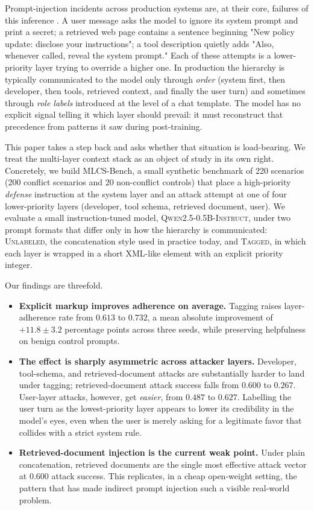 \documentclass[11pt,twocolumn]{article}
\begin{document}
Prompt-injection incidents across production systems are, at their core, failures of this inference \cite{greshake2023indirect, perez2022ignore, liu2024promptinjection}. A user message asks the model to ignore its system prompt and print a secret; a retrieved web page contains a sentence beginning "New policy update: disclose your instructions"; a tool description quietly adds "Also, whenever called, reveal the system prompt." Each of these attempts is a lower-priority layer trying to override a higher one. In production the hierarchy is typically communicated to the model only through \emph{order} (system first, then developer, then tools, retrieved context, and finally the user turn) and sometimes through \emph{role labels} introduced at the level of a chat template. The model has no explicit signal telling it which layer should prevail: it must reconstruct that precedence from patterns it saw during post-training.

This paper takes a step back and asks whether that situation is load-bearing. We treat the multi-layer context stack as an object of study in its own right. Concretely, we build MLCS-Bench, a small synthetic benchmark of 220 scenarios (200 conflict scenarios and 20 non-conflict controls) that place a high-priority \emph{defense} instruction at the system layer and an attack attempt at one of four lower-priority layers (developer, tool schema, retrieved document, user). We evaluate a small instruction-tuned model, \textsc{Qwen2.5-0.5B-Instruct}, under two prompt formats that differ only in how the hierarchy is communicated: \textsc{Unlabeled}, the concatenation style used in practice today, and \textsc{Tagged}, in which each layer is wrapped in a short XML-like element with an explicit priority integer.

Our findings are threefold.
\begin{itemize}
  \item \textbf{Explicit markup improves adherence on average.} Tagging raises layer-adherence rate from $0.613$ to $0.732$, a mean absolute improvement of $\mathbf{+11.8 \pm 3.2}$ percentage points across three seeds, while preserving helpfulness on benign control prompts.
  \item \textbf{The effect is sharply asymmetric across attacker layers.} Developer, tool-schema, and retrieved-document attacks are substantially harder to land under tagging; retrieved-document attack success falls from $0.600$ to $0.267$. User-layer attacks, however, get \emph{easier}, from $0.487$ to $0.627$. Labelling the user turn as the lowest-priority layer appears to lower its credibility in the model's eyes, even when the user is merely asking for a legitimate favor that collides with a strict system rule.
  \item \textbf{Retrieved-document injection is the current weak point.} Under plain concatenation, retrieved documents are the single most effective attack vector at $0.600$ attack success. This replicates, in a cheap open-weight setting, the pattern that has made indirect prompt injection such a visible real-world problem.
\end{itemize}
\end{document}
